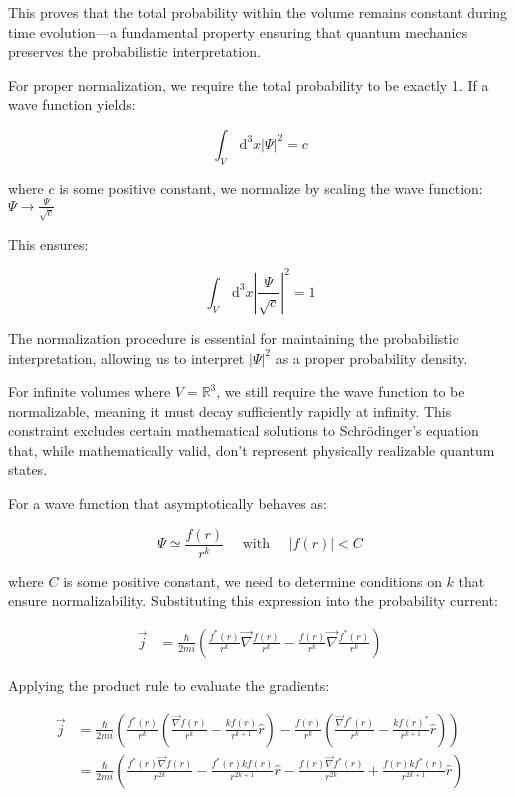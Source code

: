 \documentclass[italian]{HKNdocument}
\begin{document}
This proves that the total probability within the volume remains constant during time evolution—a fundamental property ensuring that quantum mechanics preserves the probabilistic interpretation.

For proper normalization, we require the total probability to be exactly 1. If a wave function yields:

\begin{equation}
\int_{V} \, \mathrm{d}^{3} x|\Psi|^{2}=c \label{eq:1.38}
\end{equation}

where $c$ is some positive constant, we normalize by scaling the wave function:
$\Psi \rightarrow \frac{\Psi}{\sqrt{c}}$

This ensures:

\begin{equation}
\int_{V} \, \mathrm{d}^{3} x\left|\frac{\Psi}{\sqrt{c}}\right|^{2}=1 \label{eq:1.39}
\end{equation}

The normalization procedure is essential for maintaining the probabilistic interpretation, allowing us to interpret $|\Psi|^2$ as a proper probability density.

For infinite volumes where $V=\mathbb{R}^{3}$, we still require the wave function to be normalizable, meaning it must decay sufficiently rapidly at infinity. This constraint excludes certain mathematical solutions to Schrödinger's equation that, while mathematically valid, don't represent physically realizable quantum states.


For a wave function that asymptotically behaves as:

\begin{equation}
\Psi \simeq \frac{f(r)}{r^{k}} \quad \text { with } \quad|f(r)|<C \label{eq:1.40}
\end{equation}

where $C$ is some positive constant, we need to determine conditions on $k$ that ensure normalizability. Substituting this expression into the probability current:

\begin{align}
\vec{j} &= \frac{\hbar}{2 m i}\left(\frac{f^{*}(r)}{r^{k}} \vec{\nabla} \frac{f(r)}{r^{k}}-\frac{f(r)}{r^{k}} \vec{\nabla} \frac{f^{*}(r)}{r^{k}}\right)
\end{align}

Applying the product rule to evaluate the gradients:

\begin{align}
\vec{j} &= \frac{\hbar}{2 m i}\left(\frac{f^{*}(r)}{r^{k}}\left(\frac{\vec{\nabla} f(r)}{r^{k}}-\frac{k f(r)}{r^{k+1}}\hat{r}\right)-\frac{f(r)}{r^{k}}\left(\frac{\vec{\nabla} f^{*}(r)}{r^{k}}-\frac{k f(r)^{*}}{r^{k+1}}\hat{r}\right)\right) \\
&= \frac{\hbar}{2 m i}\left(\frac{f^{*}(r) \vec{\nabla} f(r)}{r^{2 k}}-\frac{f^{*}(r) k f(r)}{r^{2 k+1}}\hat{r}-\frac{f(r) \vec{\nabla} f^{*}(r)}{r^{2 k}}+\frac{f(r) k f^{*}(r)}{r^{2 k+1}}\hat{r}\right) \label{eq:1.41}
\end{align}
\end{document}
